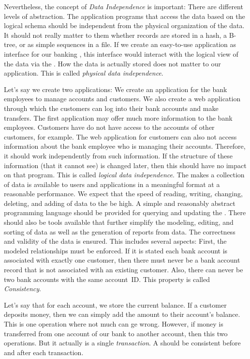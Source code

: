 Nevertheless, the concept of \emph{Data Independence} is important:
There are different levels of abstraction.
The application programs that access the data based on the logical schema should be independent from the physical organization of the data.
It should not really matter to them whether records are stored in a hash, a B\nobreakdashes-tree, or as simple sequences in a file.
If we create an easy-to-use application as interface for our banking , this interface would interact with the logical view of the data via the .
How the data is actually stored does not matter to our application.
This is called \emph{physical data independence}.

Let's say we create two applications:
We create an application for the bank employees to manage accounts and customers.
We also create a web application through which the customers can log into their bank accounts and make transfers.
The first application may offer much more information to the bank employees.
Customers have do not have access to the accounts of other customers, for example.
The web application for customers can also not access information about the bank employee who is managing their accounts.
Therefore, it should work independently from such information.
If the structure of these information (that it cannot see) is changed later, then this should have no impact on that program.
This is called \emph{logical data independence}.
\endhsection%
%
The  makes a collection of data is available to users and applications in a meaningful format at a reasonable performance.
We expect that the speed of reading, writing, changing, deleting, and adding of data to the  be high.
A simple and reasonably abstract programming language should be provided for querying and updating the .
There should also be tools available that further simplify the modeling, editing, and sorting of data as well as the generation of reports from data.%
\endhsection%
%
%
The correctness and validity of the data is ensured.
This includes several aspects:
First, the modeled relationships must be enforced.
If it is stated each bank account is associated with exactly one customer, then there must never be a bank account record that is not associated with an existing customer.
Also, there can never be two bank accounts with the same account~ID.
This property is called \emph{Consistency}.

Let's say that for each account, we store the current balance.
If a customer deposits money, then we can simply add the amount to their account's balance.
This is one operation where not much can ge wrong.
However, if money is transferred from one account of our bank to another account, then this  two operations.
But it actually is a single \emph{transaction}.
A  should be consistent before and after each transaction.

